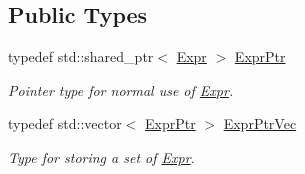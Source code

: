 \subsection*{Public Types}
\begin{DoxyCompactItemize}
\item 
\mbox{\label{classilang_1_1_expr_a85952b6a34620c4c8cab6bac9c9fdf8c}} 
typedef std\+::shared\+\_\+ptr$<$ \mbox{\hyperlink{classilang_1_1_expr}{Expr}} $>$ \mbox{\hyperlink{classilang_1_1_expr_a85952b6a34620c4c8cab6bac9c9fdf8c}{Expr\+Ptr}}
\begin{DoxyCompactList}\small\item\em Pointer type for normal use of \mbox{\hyperlink{classilang_1_1_expr}{Expr}}. \end{DoxyCompactList}\item 
\mbox{\label{classilang_1_1_expr_a17efc8282f647681d37cd4c78928aa01}} 
typedef std\+::vector$<$ \mbox{\hyperlink{classilang_1_1_expr_a85952b6a34620c4c8cab6bac9c9fdf8c}{Expr\+Ptr}} $>$ \mbox{\hyperlink{classilang_1_1_expr_a17efc8282f647681d37cd4c78928aa01}{Expr\+Ptr\+Vec}}
\begin{DoxyCompactList}\small\item\em Type for storing a set of \mbox{\hyperlink{classilang_1_1_expr}{Expr}}. \end{DoxyCompactList}\end{DoxyCompactItemize}
